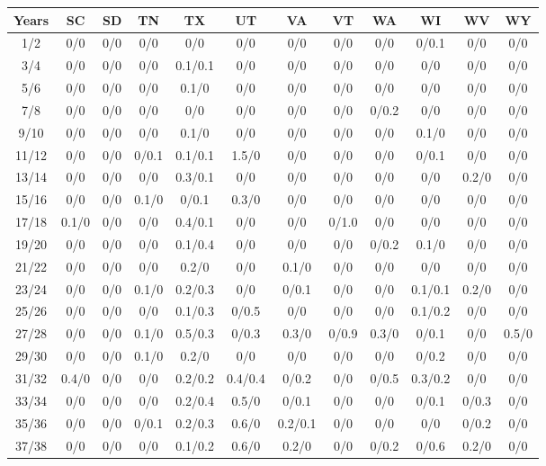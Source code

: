 \begin{table*}[htb]
\footnotesize
    \centering
    \begin{tabular}{|c| c c c c c c c c c c c |}\hline
        \textbf{Years} & \textbf{SC}& \textbf{SD}& \textbf{TN}& \textbf{TX}& \textbf{UT}& \textbf{VA}& \textbf{VT}& \textbf{WA}& \textbf{WI}& \textbf{WV}& \textbf{WY} \\\hline
    1/2&0/0& 0/0& 0/0& 0/0& 0/0& 0/0& 0/0& 0/0& 0/0.1& 0/0& 0/0\\\hline
3/4&0/0& 0/0& 0/0& 0.1/0.1& 0/0& 0/0& 0/0& 0/0& 0/0& 0/0& 0/0\\\hline
5/6&0/0& 0/0& 0/0& 0.1/0& 0/0& 0/0& 0/0& 0/0& 0/0& 0/0& 0/0\\\hline
7/8&0/0& 0/0& 0/0& 0/0& 0/0& 0/0& 0/0& 0/0.2& 0/0& 0/0& 0/0\\\hline
9/10&0/0& 0/0& 0/0& 0.1/0& 0/0& 0/0& 0/0& 0/0& 0.1/0& 0/0& 0/0\\\hline
11/12&0/0& 0/0& 0/0.1& 0.1/0.1& 1.5/0& 0/0& 0/0& 0/0& 0/0.1& 0/0& 0/0\\\hline
13/14&0/0& 0/0& 0/0& 0.3/0.1& 0/0& 0/0& 0/0& 0/0& 0/0& 0.2/0& 0/0\\\hline
15/16&0/0& 0/0& 0.1/0& 0/0.1& 0.3/0& 0/0& 0/0& 0/0& 0/0& 0/0& 0/0\\\hline
17/18&0.1/0& 0/0& 0/0& 0.4/0.1& 0/0& 0/0& 0/1.0& 0/0& 0/0& 0/0& 0/0\\\hline
19/20&0/0& 0/0& 0/0& 0.1/0.4& 0/0& 0/0& 0/0& 0/0.2& 0.1/0& 0/0& 0/0\\\hline
21/22&0/0& 0/0& 0/0& 0.2/0& 0/0& 0.1/0& 0/0& 0/0& 0/0& 0/0& 0/0\\\hline
23/24&0/0& 0/0& 0.1/0& 0.2/0.3& 0/0& 0/0.1& 0/0& 0/0& 0.1/0.1& 0.2/0& 0/0\\\hline
25/26&0/0& 0/0& 0/0& 0.1/0.3& 0/0.5& 0/0& 0/0& 0/0& 0.1/0.2& 0/0& 0/0\\\hline
27/28&0/0& 0/0& 0.1/0& 0.5/0.3& 0/0.3& 0.3/0& 0/0.9& 0.3/0& 0/0.1& 0/0& 0.5/0\\\hline
29/30&0/0& 0/0& 0.1/0& 0.2/0& 0/0& 0/0& 0/0& 0/0& 0/0.2& 0/0& 0/0\\\hline
31/32&0.4/0& 0/0& 0/0& 0.2/0.2& 0.4/0.4& 0/0.2& 0/0& 0/0.5& 0.3/0.2& 0/0& 0/0\\\hline
33/34&0/0& 0/0& 0/0& 0.2/0.4& 0.5/0& 0/0.1& 0/0& 0/0& 0/0.1& 0/0.3& 0/0\\\hline
35/36&0/0& 0/0& 0/0.1& 0.2/0.3& 0.6/0& 0.2/0.1& 0/0& 0/0& 0/0& 0/0.2& 0/0\\\hline
37/38&0/0& 0/0& 0/0& 0.1/0.2& 0.6/0& 0.2/0& 0/0& 0/0.2& 0/0.6& 0.2/0& 0/0\\\hline

\end{tabular}
\end{table*}
